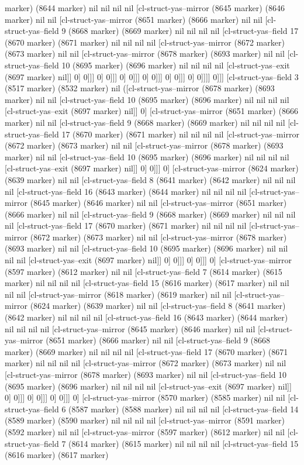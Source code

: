 {{marker) (8644 marker) nil nil nil nil [cl-struct-yas--mirror (8645 marker) (8646 marker) nil nil [cl-struct-yas--mirror (8651 marker) (8666 marker) nil nil [cl-struct-yas--field 9 (8668 marker) (8669 marker) nil nil nil nil [cl-struct-yas--field 17 (8670 marker) (8671 marker) nil nil nil nil [cl-struct-yas--mirror (8672 marker) (8673 marker) nil nil [cl-struct-yas--mirror (8678 marker) (8693 marker) nil nil [cl-struct-yas--field 10 (8695 marker) (8696 marker) nil nil nil nil [cl-struct-yas--exit (8697 marker) nil]] 0] 0]]] 0] 0]]] 0] 0]]] 0] 0]]] 0] 0]]] 0] 0]]]] 0]]] [cl-struct-yas--field 3 (8517 marker) (8532 marker) nil ([cl-struct-yas--mirror (8678 marker) (8693 marker) nil nil [cl-struct-yas--field 10 (8695 marker) (8696 marker) nil nil nil nil [cl-struct-yas--exit (8697 marker) nil]] 0] [cl-struct-yas--mirror (8651 marker) (8666 marker) nil nil [cl-struct-yas--field 9 (8668 marker) (8669 marker) nil nil nil nil [cl-struct-yas--field 17 (8670 marker) (8671 marker) nil nil nil nil [cl-struct-yas--mirror (8672 marker) (8673 marker) nil nil [cl-struct-yas--mirror (8678 marker) (8693 marker) nil nil [cl-struct-yas--field 10 (8695 marker) (8696 marker) nil nil nil nil [cl-struct-yas--exit (8697 marker) nil]] 0] 0]]] 0] [cl-struct-yas--mirror (8624 marker) (8639 marker) nil nil [cl-struct-yas--field 8 (8641 marker) (8642 marker) nil nil nil nil [cl-struct-yas--field 16 (8643 marker) (8644 marker) nil nil nil nil [cl-struct-yas--mirror (8645 marker) (8646 marker) nil nil [cl-struct-yas--mirror (8651 marker) (8666 marker) nil nil [cl-struct-yas--field 9 (8668 marker) (8669 marker) nil nil nil nil [cl-struct-yas--field 17 (8670 marker) (8671 marker) nil nil nil nil [cl-struct-yas--mirror (8672 marker) (8673 marker) nil nil [cl-struct-yas--mirror (8678 marker) (8693 marker) nil nil [cl-struct-yas--field 10 (8695 marker) (8696 marker) nil nil nil nil [cl-struct-yas--exit (8697 marker) nil]] 0] 0]]] 0] 0]]] 0] [cl-struct-yas--mirror (8597 marker) (8612 marker) nil nil [cl-struct-yas--field 7 (8614 marker) (8615 marker) nil nil nil nil [cl-struct-yas--field 15 (8616 marker) (8617 marker) nil nil nil nil [cl-struct-yas--mirror (8618 marker) (8619 marker) nil nil [cl-struct-yas--mirror (8624 marker) (8639 marker) nil nil [cl-struct-yas--field 8 (8641 marker) (8642 marker) nil nil nil nil [cl-struct-yas--field 16 (8643 marker) (8644 marker) nil nil nil nil [cl-struct-yas--mirror (8645 marker) (8646 marker) nil nil [cl-struct-yas--mirror (8651 marker) (8666 marker) nil nil [cl-struct-yas--field 9 (8668 marker) (8669 marker) nil nil nil nil [cl-struct-yas--field 17 (8670 marker) (8671 marker) nil nil nil nil [cl-struct-yas--mirror (8672 marker) (8673 marker) nil nil [cl-struct-yas--mirror (8678 marker) (8693 marker) nil nil [cl-struct-yas--field 10 (8695 marker) (8696 marker) nil nil nil nil [cl-struct-yas--exit (8697 marker) nil]] 0] 0]]] 0] 0]]] 0] 0]]] 0] [cl-struct-yas--mirror (8570 marker) (8585 marker) nil nil [cl-struct-yas--field 6 (8587 marker) (8588 marker) nil nil nil nil [cl-struct-yas--field 14 (8589 marker) (8590 marker) nil nil nil nil [cl-struct-yas--mirror (8591 marker) (8592 marker) nil nil [cl-struct-yas--mirror (8597 marker) (8612 marker) nil nil [cl-struct-yas--field 7 (8614 marker) (8615 marker) nil nil nil nil [cl-struct-yas--field 15 (8616 marker) (8617 marker) }}
